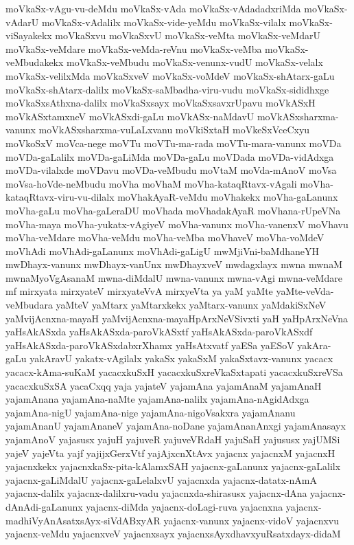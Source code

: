{moVkaSx-vAgu-vu-deMdu
moVkaSx-vAda
moVkaSx-vAdadadxriMda
moVkaSx-vAdarU
moVkaSx-vAdalilx
moVkaSx-vide-yeMdu
moVkaSx-vilalx
moVkaSx-viSayakekx
moVkaSxvu
moVkaSxvU
moVkaSx-veMta
moVkaSx-veMdarU
moVkaSx-veMdare
moVkaSx-veMda-reVnu
moVkaSx-veMba
moVkaSx-veMbudakekx
moVkaSx-veMbudu
moVkaSx-venunx-vudU
moVkaSx-velalx
moVkaSx-velilxMda
moVkaSxveV
moVkaSx-voMdeV
moVkaSx-shAtarx-gaLu
moVkaSx-shAtarx-dalilx
moVkaSx-saMbadha-viru-vudu
moVkaSx-sididhxge
moVkaSxsAthxna-dalilx
moVkaSxsayx
moVkaSxsavxrUpavu
moVkASxH
moVkASxtamxneV
moVkASxdi-gaLu
moVkASx-naMdavU
moVkASxsharxma-vanunx
moVkASxsharxma-vuLaLxvanu
moVkiSxtaH
moVkeSxVceCxyu
moVkoSxV
moVca-nege
moVTu
moVTu-ma-rada
moVTu-mara-vanunx
moVDa
moVDa-gaLalilx
moVDa-gaLiMda
moVDa-gaLu
moVDada
moVDa-vidAdxga
moVDa-vilalxde
moVDavu
moVDa-veMbudu
moVtaM
moVda-mAnoV
moVsa
moVsa-hoVde-neMbudu
moVha
moVhaM
moVha-kataqRtavx-vAgali
moVha-kataqRtavx-viru-vu-dilalx
moVhakAyaR-veMdu
moVhakekx
moVha-gaLanunx
moVha-gaLu
moVha-gaLeraDU
moVhada
moVhadakAyaR
moVhana-rUpeVNa
moVha-maya
moVha-yukatx-vAgiyeV
moVha-vanunx
moVha-vanenxV
moVhavu
moVha-veMdare
moVha-veMdu
moVha-veMba
moVhaveV
moVha-voMdeV
moVhAdi
moVhAdi-gaLanunx
moVhAdi-gaLigU
mwMjiVni-baMdhaneYH
mwDhayx-vanunx
mwDhayx-vanUnx
mwDhayxveV
mwdagxlayx
mwna
mwnaM
mwnaMyoVgAsanaM
mwna-diMdalU
mwna-vanunx
mwna-vAgi
mwna-veMdare
mf
mirxyata
mirxyateV
mirxyateVvA
mirxyeVta
ya
yaM
yaMte
yaMte-veVda-veMbudara
yaMteV
yaMtarx
yaMtarxkekx
yaMtarx-vanunx
yaMdakiSxNeV
yaMvijAcnxna-mayaH
yaMvijAcnxna-mayaHpArxNeVSivxti
yaH
yaHpArxNeVna
yaHsAkASxda
yaHsAkASxda-paroVkASxtf
yaHsAkASxda-paroVkASxdf
yaHsAkASxda-paroVkASxdabxrXhamx
yaHsAtxvatf
yaESa
yaESoV
yakAra-gaLu
yakAravU
yakatx-vAgilalx
yakaSx
yakaSxM
yakaSxtavx-vanunx
yacacx
yacacx-kAma-suKaM
yacacxkuSxH
yacacxkuSxreVkaSxtapati
yacacxkuSxreVSa
yacacxkuSxSA
yacaCxqq
yaja
yajateV
yajamAna
yajamAnaM
yajamAnaH
yajamAnana
yajamAna-naMte
yajamAna-nalilx
yajamAna-nAgidAdxga
yajamAna-nigU
yajamAna-nige
yajamAna-nigoVsakxra
yajamAnanu
yajamAnanU
yajamAnaneV
yajamAna-noDane
yajamAnanAnxgi
yajamAnasayx
yajamAnoV
yajasusx
yajuH
yajuveR
yajuveVRdaH
yajuSaH
yajususx
yajUMSi
yajeV
yajeVta
yajf
yajijxGerxVtf
yajAjxcnXtAvx
yajacnx
yajacnxM
yajacnxH
yajacnxkekx
yajacnxkaSx-pita-kAlamxSAH
yajacnx-gaLanunx
yajacnx-gaLalilx
yajacnx-gaLiMdalU
yajacnx-gaLelalxvU
yajacnxda
yajacnx-datatx-nAmA
yajacnx-dalilx
yajacnx-dalilxru-vadu
yajacnxda-shirasusx
yajacnx-dAna
yajacnx-dAnAdi-gaLanunx
yajacnx-diMda
yajacnx-doLagi-ruva
yajacnxna
yajacnx-madhiVyAnAsatxsAyx-siVdABxyAR
yajacnx-vanunx
yajacnx-vidoV
yajacnxvu
yajacnx-veMdu
yajacnxveV
yajacnxsayx
yajacnxsAyxdhavxyuRsatxdayx-didaM
}
